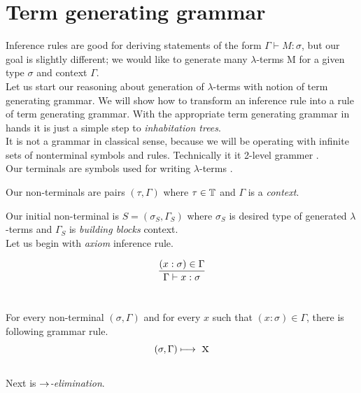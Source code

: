\documentclass[12pt,a4paper]{report}
\newcommand{\Lets}{Let us\xspace}
\newcommand{\lterms}{$\lambda$-terms\xspace}
\newcommand{\tur}[3]{#1\vdash{}#2:#3}
\newcommand{\turst}[3]{$#1\vdash{}#2:#3$\xspace}
\newcommand{\GMS}{\turst{\Gamma}{M}{\sigma}}
\begin{document}



\section{Term generating grammar}
\label{Term-generating-grammar}

\newcommand{\gar}{\longmapsto}

Inference rules are good for deriving statements of the form \GMS, but our
goal is slightly different; we would like to generate many \lterms M for a given type 
$\sigma$ and context $\Gamma$.\\

\Lets start our reasoning about generation of \lterms with
notion of term generating grammar. We will show how to
transform an inference rule into a rule of term generating grammar.
With the appropriate term generating grammar 
in hands it is just a simple step to \textit{inhabitation trees}.\\

It is not a grammar in classical sense, because we will be operating with infinite sets of nonterminal symbols and rules. Technically it it
2-level grammer \cite{barendregt10}.\\

Our terminals are symbols used for writing \lterms 
.%

Our non-terminals are pairs $(\tau,\Gamma)$ where 
$\tau \in \mathbb{T}$ and $\Gamma$ is a \textit{context}.

Our initial non-terminal is $S = (\sigma_S,\Gamma_S)$
where $\sigma_S$ is desired type of generated \lterms and
$\Gamma_S$ is \textit{building blocks} context. \\

\Lets begin with \textit{axiom} inference rule.

$$
\ruleI { (x:\sigma) \in \Gamma }
       { \tur{\Gamma}{x}{\sigma} }
$$~


For every non-terminal $(\sigma,\Gamma)$ 
and for every $x$ such that $(x:\sigma) \in \Gamma$,
there is following grammar rule.
$$ ( \sigma , \Gamma )  \longmapsto \mbox{ {\Large x}} $$ \\

Next is \textit{$\rightarrow$-elimination}.
\end{document}
